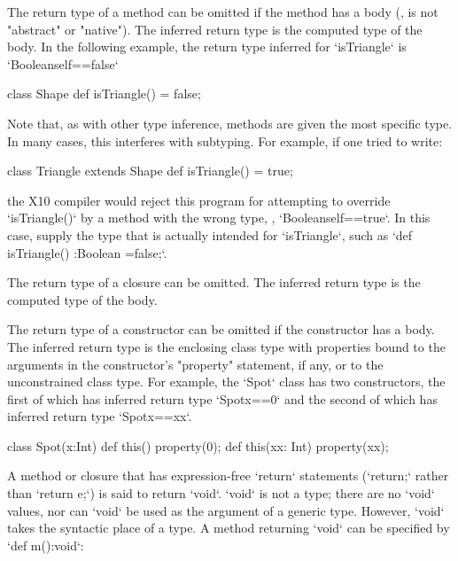{The return type of a method can be omitted if the method has a body (\ie, is
not \xcd"abstract" or \xcd"native"). The inferred return type is the computed
type of the body.  In the following example, the return type inferred for
\xcd`isTriangle` is 
\xcd`Boolean{self==false}`
\begin{xten}
class Shape {
  def isTriangle() = false; 
}  
\end{xten}
%
Note that, as with other type inference, methods are given the most specific
type.  In many cases, this interferes with subtyping.  For example, if one
tried to write: 
\begin{xten}
class Triangle extends Shape {
  def isTriangle() = true;
}
\end{xten}
\noindent
the X10 compiler would reject this program for attempting to override
\xcd`isTriangle()` by a method with the wrong type, \viz,
\xcd`Boolean{self==true}`.  In this case, supply the type that is actually
intended for \xcd`isTriangle`, such as 
\xcd`def isTriangle() :Boolean =false;`. 

The return type of a closure can be omitted.
The inferred return type is the computed type of the body.

The return type of a constructor can be omitted if the
constructor has a body.
The inferred return type is the enclosing class type with
properties bound to the arguments in the constructor's \xcd"property"
statement, if any, or to the unconstrained class type.
For example, the \xcd`Spot` class has two constructors, the first of which has
inferred return type \xcd`Spot{x==0}` and the second of which has 
inferred return type \xcd`Spot{x==xx}`. 
\begin{xten}
class Spot(x:Int) {
  def this() {property(0);}
  def this(xx: Int) { property(xx); }
}
\end{xten}



A method or closure that has expression-free \xcd`return` statements
(\xcd`return;` rather than \xcd`return e;`) is said to return \xcd`void`.
\xcd`void` is not a type; there are no \xcd`void` values, nor can \xcd`void`
be used as the argument of a generic type. However, \xcd`void` takes the
syntactic place of a type. A method returning \xcd`void` can be specified by
\xcd`def m():void`: 

}
